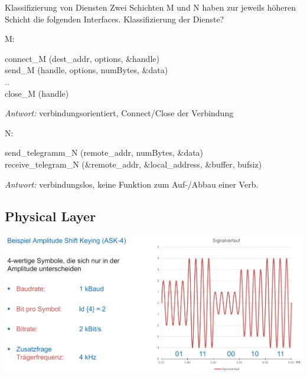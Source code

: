 \begin{example2}{Klassifizierung von Diensten}
  Zwei Schichten M und N haben zur jeweils höheren Schicht die folgenden Interfaces. Klassifizierung der Dienste?

  \vspace{1mm}

  M:

connect\_M (dest\_addr, options, \&handle)\\
send\_M (handle, options, numBytes, \&data)\\
..\\
close\_M (handle)

\emph{Antwort:} verbindungsorientiert, Connect/Close der Verbindung

\vspace{1mm}

N:

send\_telegramm\_N (remote\_addr, numBytes, \&data)\\
receive\_telegram\_N (\&remote\_addr, \&local\_address, \&buffer, bufsiz)

\emph{Antwort:} verbindungslos, keine Funktion zum Auf-/Abbau einer Verb.
\end{example2}

\subsection*{Physical Layer}

\begin{example}
    \includegraphics[width=1\linewidth]{images/amplitude_shift_keying.png}
\end{example}

